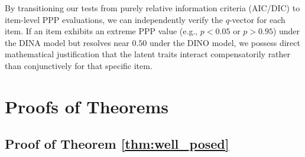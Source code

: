 \documentclass[11pt,a4paper]{article}
\begin{document}
By transitioning our tests from purely relative information criteria (AIC/DIC) 
to item-level PPP evaluations, we can independently verify the 
$q$-vector for each item. 
If an item exhibits an extreme PPP value (e.g., $p < 0.05$ or $p > 0.95$) 
under the DINA model but resolves near $0.50$ under the DINO model, 
we possess direct mathematical justification that the latent traits 
interact compensatorily rather than conjunctively for that specific item.

\newpage
\appendix
\section{Proofs of Theorems}

\subsection{Proof of Theorem \ref{thm:well_posed}} \label{app:proof_well_posed}
\end{document}
